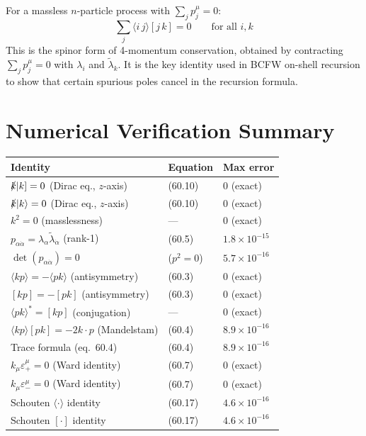 For a massless $n$-particle process with $\sum_j p_j^\mu = 0$:
\begin{equation}
  \sum_j \langle i\,j\rangle[j\,k] = 0
  \qquad \text{for all } i, k
  \tag{60.18}
\end{equation}
This is the spinor form of 4-momentum conservation, obtained by contracting
$\sum_j p_j^\mu = 0$ with $\lambda_i$ and $\tilde\lambda_k$.  It is the key
identity used in BCFW on-shell recursion to show that certain spurious poles
cancel in the recursion formula.

\section{Numerical Verification Summary}

\begin{center}
\renewcommand{\arraystretch}{1.5}
\begin{tabular}{@{}lll@{}}
  \toprule
  Identity & Equation & Max error \\
  \midrule
  $\slashed{k}|k] = 0$ (Dirac eq., $z$-axis)
    & (60.10) & $0$ (exact) \\
  $\slashed{k}|k\rangle = 0$ (Dirac eq., $z$-axis)
    & (60.10) & $0$ (exact) \\
  $k^2 = 0$ (masslessness)
    & --- & $0$ (exact) \\
  $p_{\alpha\dot\alpha} = \lambda_\alpha\tilde\lambda_{\dot\alpha}$ (rank-1)
    & (60.5) & $1.8\times10^{-15}$ \\
  $\det(p_{\alpha\dot\alpha}) = 0$
    & ($p^2=0$) & $5.7\times10^{-16}$ \\
  $\langle kp\rangle = -\langle pk\rangle$ (antisymmetry)
    & (60.3) & $0$ (exact) \\
  $[kp] = -[pk]$ (antisymmetry)
    & (60.3) & $0$ (exact) \\
  $\langle pk\rangle^* = [kp]$ (conjugation)
    & --- & $0$ (exact) \\
  $\langle kp\rangle[pk] = -2k\cdot p$ (Mandelstam)
    & (60.4) & $8.9\times10^{-16}$ \\
  Trace formula (eq.~60.4)
    & (60.4) & $8.9\times10^{-16}$ \\
  $k_\mu\varepsilon_+^\mu = 0$ (Ward identity)
    & (60.7) & $0$ (exact) \\
  $k_\mu\varepsilon_-^\mu = 0$ (Ward identity)
    & (60.7) & $0$ (exact) \\
  Schouten $\langle\cdot\rangle$ identity
    & (60.17) & $4.6\times10^{-16}$ \\
  Schouten $[\cdot]$ identity
    & (60.17) & $4.6\times10^{-16}$ \\
  \bottomrule
\end{tabular}
\end{center}

